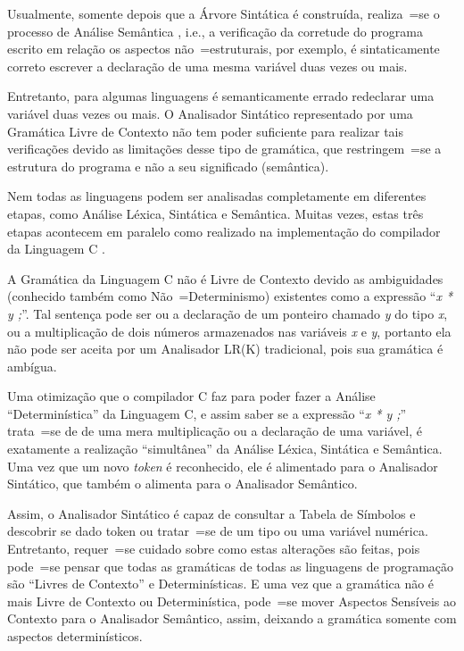 {    Usualmente,
    somente depois que a Árvore Sintática é construída,
    realiza~=se o processo de Análise Semântica \cite{ahoCompilerDragonBook},
    i.e.,
    a verificação da corretude do programa escrito em relação os aspectos não~=estruturais,
    por exemplo,
    é sintaticamente correto escrever a declaração de uma mesma variável duas vezes ou
    mais.

    Entretanto,
    para algumas linguagens é semanticamente errado redeclarar uma variável duas vezes ou
    mais.
    O Analisador Sintático representado por uma Gramática Livre de Contexto não tem poder suficiente para realizar tais verificações devido as limitações desse tipo de gramática,
    que restringem~=se a estrutura do programa e
    não a seu significado (semântica).

    Nem todas as linguagens podem ser analisadas completamente em diferentes etapas,
    como Análise Léxica, Sintática e Semântica. Muitas vezes,
    estas três etapas acontecem em paralelo como realizado na implementação do compilador da Linguagem C \cite{jourdan2017,whyCcannotBeParsedWithALR1Parser}.

    A Gramática da Linguagem C não é Livre de Contexto devido as ambiguidades (conhecido também como Não~=Determinismo) existentes como a expressão ``\textit{x * y ;}''.
    Tal sentença pode ser ou
    a declaração de um ponteiro chamado \textit{y} do tipo \textit{x},
    ou a multiplicação de dois números armazenados nas variáveis \textit{x} e
    \textit{y},
    portanto ela não pode ser aceita por um Analisador LR(K) tradicional,
    pois sua gramática é ambígua.

    Uma otimização que o compilador C faz para poder fazer a Análise ``Determinística'' da Linguagem C,
    e assim saber se a expressão ``\textit{x * y ;}'' trata~=se de de uma mera multiplicação ou
    a declaração de uma variável,
    é exatamente a realização ``simultânea'' da Análise Léxica,
    Sintática e
    Semântica.
    Uma vez que um novo \textit{token} é reconhecido,
    ele é alimentado para o Analisador Sintático,
    que também o alimenta para o Analisador Semântico.

    Assim,
    o Analisador Sintático é capaz de consultar a Tabela de Símbolos \cite{ahoCompilerDragonBook} e
    descobrir se dado token ou
    tratar~=se de um tipo ou
    uma variável numérica.
    Entretanto,
    requer~=se cuidado sobre como estas alterações são feitas,
    pois pode~=se pensar que todas as gramáticas de todas as linguagens de programação são ``Livres de Contexto'' e
    Determinísticas.
    E uma vez que a gramática não é mais Livre de Contexto ou
    Determinística,
    pode~=se mover Aspectos Sensíveis ao Contexto para o Analisador Semântico,
    assim,
    deixando a gramática somente com aspectos determinísticos.


}
